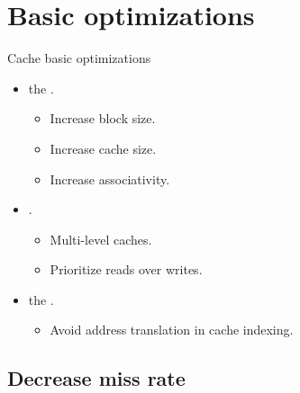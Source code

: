 \section{Basic optimizations}

\begin{frame}[t]{Cache basic optimizations}
\begin{itemize}
  \item {} the .
    \begin{itemize}
      \item Increase block size.
      \item Increase cache size.
      \item Increase associativity.
    \end{itemize}

  \item {} .
    \begin{itemize}
      \item Multi-level caches.
      \item Prioritize reads over writes.
    \end{itemize}

  \item {} the .
    \begin{itemize}
      \item Avoid address translation in cache indexing.
    \end{itemize}

\end{itemize}
\end{frame}

\subsection{Decrease miss rate}

